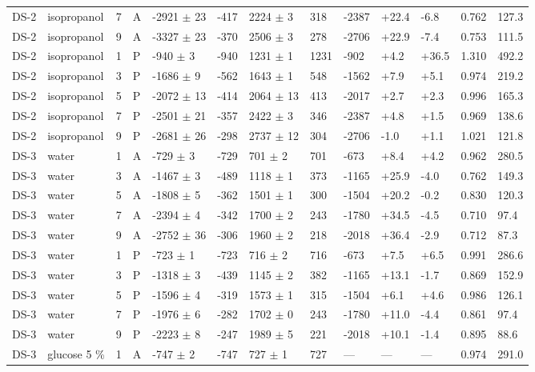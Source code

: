 \documentclass[11pt,a4paper]{article}
\begin{document}
\begin{landscape}
{\begin{longtable}{@{}lllllllllllll@{}}
DS-2 & isopropanol & 7 & A & -2921 $\pm$ 23 & -417 & 2224 $\pm$ 3 & 318 & -2387 & +22.4 & -6.8 & 0.762 & 127.3 \\
DS-2 & isopropanol & 9 & A & -3327 $\pm$ 23 & -370 & 2506 $\pm$ 3 & 278 & -2706 & +22.9 & -7.4 & 0.753 & 111.5 \\
DS-2 & isopropanol & 1 & P & -940 $\pm$ 3 & -940 & 1231 $\pm$ 1 & 1231 & -902 & +4.2 & +36.5 & 1.310 & 492.2 \\
DS-2 & isopropanol & 3 & P & -1686 $\pm$ 9 & -562 & 1643 $\pm$ 1 & 548 & -1562 & +7.9 & +5.1 & 0.974 & 219.2 \\
DS-2 & isopropanol & 5 & P & -2072 $\pm$ 13 & -414 & 2064 $\pm$ 13 & 413 & -2017 & +2.7 & +2.3 & 0.996 & 165.3 \\
DS-2 & isopropanol & 7 & P & -2501 $\pm$ 21 & -357 & 2422 $\pm$ 3 & 346 & -2387 & +4.8 & +1.5 & 0.969 & 138.6 \\
DS-2 & isopropanol & 9 & P & -2681 $\pm$ 26 & -298 & 2737 $\pm$ 12 & 304 & -2706 & -1.0 & +1.1 & 1.021 & 121.8 \\
DS-3 & water & 1 & A & -729 $\pm$ 3 & -729 & 701 $\pm$ 2 & 701 & -673 & +8.4 & +4.2 & 0.962 & 280.5 \\
DS-3 & water & 3 & A & -1467 $\pm$ 3 & -489 & 1118 $\pm$ 1 & 373 & -1165 & +25.9 & -4.0 & 0.762 & 149.3 \\
DS-3 & water & 5 & A & -1808 $\pm$ 5 & -362 & 1501 $\pm$ 1 & 300 & -1504 & +20.2 & -0.2 & 0.830 & 120.3 \\
DS-3 & water & 7 & A & -2394 $\pm$ 4 & -342 & 1700 $\pm$ 2 & 243 & -1780 & +34.5 & -4.5 & 0.710 & 97.4 \\
DS-3 & water & 9 & A & -2752 $\pm$ 36 & -306 & 1960 $\pm$ 2 & 218 & -2018 & +36.4 & -2.9 & 0.712 & 87.3 \\
DS-3 & water & 1 & P & -723 $\pm$ 1 & -723 & 716 $\pm$ 2 & 716 & -673 & +7.5 & +6.5 & 0.991 & 286.6 \\
DS-3 & water & 3 & P & -1318 $\pm$ 3 & -439 & 1145 $\pm$ 2 & 382 & -1165 & +13.1 & -1.7 & 0.869 & 152.9 \\
DS-3 & water & 5 & P & -1596 $\pm$ 4 & -319 & 1573 $\pm$ 1 & 315 & -1504 & +6.1 & +4.6 & 0.986 & 126.1 \\
DS-3 & water & 7 & P & -1976 $\pm$ 6 & -282 & 1702 $\pm$ 0 & 243 & -1780 & +11.0 & -4.4 & 0.861 & 97.4 \\
DS-3 & water & 9 & P & -2223 $\pm$ 8 & -247 & 1989 $\pm$ 5 & 221 & -2018 & +10.1 & -1.4 & 0.895 & 88.6 \\
DS-3 & glucose 5 \% & 1 & A & -747 $\pm$ 2 & -747 & 727 $\pm$ 1 & 727 & --- & --- & --- & 0.974 & 291.0 \\

\end{longtable}}
\end{landscape}
\end{document}
